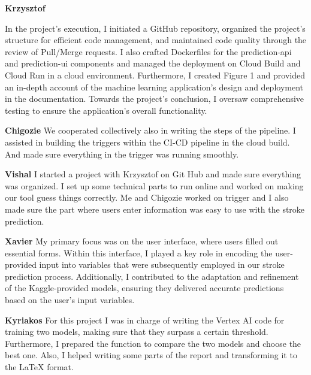 

\textbf{Krzysztof}

In the project's execution, I initiated a GitHub repository, organized the project's structure for efficient code management, and maintained code quality through the review of Pull/Merge requests. I also crafted Dockerfiles for the prediction-api and prediction-ui components and managed the deployment on Cloud Build and Cloud Run in a cloud environment. Furthermore, I created Figure 1 and provided an in-depth account of the machine learning application's design and deployment in the documentation. Towards the project's conclusion, I oversaw comprehensive testing to ensure the application's overall functionality.
 
\textbf{Chigozie}
We cooperated collectively also in writing the steps of the pipeline. I assisted in building the triggers within the CI-CD pipeline in the cloud build. And made sure everything in the trigger was running smoothly.

\textbf{Vishal}
I started a project with Krzysztof on Git Hub and made sure everything was organized. I set up some technical parts to run online and worked on making our tool guess things correctly. Me and Chigozie worked on trigger and I also made sure the part where users enter information was easy to use with the stroke prediction. 

\textbf{Xavier}
My primary focus was on the user interface, where users filled out essential forms. Within this interface, I played a key role in encoding the user-provided input into variables that were subsequently employed in our stroke prediction process. Additionally, I contributed to the adaptation and refinement of the Kaggle-provided models, ensuring they delivered accurate predictions based on the user's input variables.


\textbf{Kyriakos} For this project I was in charge of writing the Vertex AI code for training two models, making sure that they surpass a certain threshold. Furthermore, I prepared the function to compare the two models and choose the best one. Also, I helped writing some parts of the report and transforming it to the LaTeX format.
